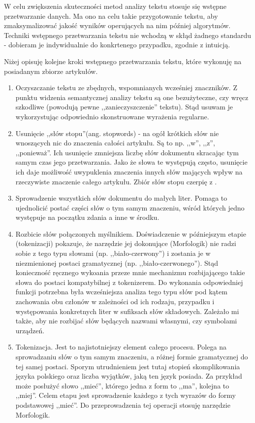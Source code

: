 \documentclass[pl]{minipw} %
\begin{document}
W celu zwiększenia skuteczności metod analizy tekstu stosuje się wstępne przetwarzanie danych. Ma ono na celu takie przygotowanie tekstu, aby zmaksymalizować jakość wyników operujących na nim później algorytmów. Techniki wstępnego przetwarzania tekstu nie wchodzą w skłąd żadnego standardu - dobieram je indywidualnie do konkrtenego przypadku, zgodnie z intuicją.

Niżej opisuję kolejne kroki wstępnego przetwarzania tekstu, które wykonuję na posiadanym zbiorze artykułów.
\begin{enumerate}
	\item Oczyszczanie tekstu ze zbędnych, wspomnianych wcześniej znaczników. Z punktu widzenia semantycznej analizy tekstu są one bezużyteczne, czy wręcz szkodliwe (powodują pewne ,,zanieczyszczenie'' tekstu). Stąd usuwam je wykorzystując odpowiednio skonstruowane wyrażenia regularne.
	\item Usunięcie ,,słów stopu''(ang. stopwords) - na ogół krótkich słów nie wnoszących nic do znaczenia całości artykułu. Są to np. ,,w'', ,,z'', ,,ponieważ''. Ich usunięcie zmniejsza liczbę słów dokumentu skracając tym samym czas jego przetwarzania. Jako że słowa te występują często, usunięcie ich daje możliwość uwypuklenia znaczenia innych słów mających wpływ na rzeczywiste znaczenie całego artykułu. Zbiór słów stopu czerpię z \cite{stopwords}.
	\item Sprowadzenie wszystkich słów dokumentu do małych liter. Pomaga to ujednolicić postać części słów o tym samym znaczeniu, wśród których jedno występuje na początku zdania a inne w środku.
	\item Rozbicie słów połączonych myślnikiem. Doświadczenie w późniejszym etapie (tokenizacji) pokazuje, że narzędzie jej dokonujące (Morfologik\cite{morfologik}) nie radzi sobie z tego typu słowami (np. ,,biało-czerwony'') i zostania je w niezmienionej postaci gramatycznej (np. ,,biało-czerwonego''). Stąd konieczność ręcznego wykoania przeze mnie mechanizmu rozbijającego takie słowa do postaci kompatybilnej z tokenizerem. Do wykonania odpowiedniej funkcji potrzebna była wcześniejsza analiza tego typu słów pod kątem zachowania obu członów w zależności od ich rodzaju, przypadku i występowania konkretnych liter w sufiksach słów składowych. Zależało mi także, aby nie rozbijać słów będących nazwami własnymi, czy symbolami urządzeń.
	\item Tokenizacja. Jest to najistotniejszy element całego procesu. Polega na sprowadzaniu słów o tym samym znaczeniu, a różnej formie gramatycznej do tej samej postaci. Sporym utrudnieniem jest tutaj stopień skomplikowania języka polskiego oraz liczba wyjątków, jaką ten język posiada. Za przykład może posłużyć słowo ,,mieć'', którego jedna z form to ,,ma'', kolejna to ,,miej''. Celem etapu jest sprowadzenie każdego z tych wyrazów do formy podstawowej ,,mieć''. Do przeprowadzenia tej operacji stosuję narzędzie Morfologik\cite{morfologik}.
\end{enumerate}
\end{document}
